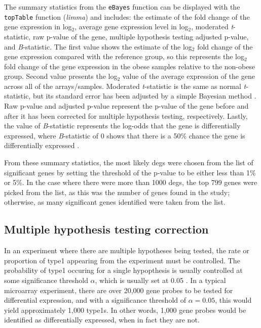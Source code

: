 The summary statistics from the \texttt{eBayes} function can be displayed with the \texttt{topTable} function (\textit{limma}) and includes: the estimate of the fold change of the gene expression in log$_2$, average gene expression level in log$_2$, moderated \textit{t}-statistic, raw p-value of the gene, multiple hypothesis testing adjusted p-value, and \textit{B}-statistic.
The first value shows the estimate of the log$_2$ fold change of the gene expression compared with the reference group, so this represents the log$_2$ fold change of the gene expression in the obese samples relative to the non-obese group.
Second value presents the log$_2$ value of the average expression of the gene across all of the arrays/samples.
Moderated \textit{t}-statistic is the same as normal \textit{t}-statistic, but its standard error has been adjusted by a simple Bayesian method \citep{Smyth2005}.
Raw p-value and adjusted p-value represent the p-value of the gene before and after it has been corrected for multiple hypothesis testing, respectively.
Lastly, the value of \textit{B}-statistic represents the log-odds that the gene is differentially expressed, where \textit{B}-statistic of 0 shows that there is a 50\% chance the gene is differentially expressed \citep{Smyth2005}.

From these summary statistics, the most likely \glspl{deg} were chosen from the list of significant genes by setting the threshold of the p-value to be either less than 1\% or 5\%.
In the case where there were more than 1000 \glspl{deg}, the top 799 genes were picked from the list, as this was the number of genes found in the \citet{Creighton2012} study; otherwise, as many significant genes identified were taken from the list.

\subsection{Multiple hypothesis testing correction}
\label{sub:multiple_hypothesis_testing_correction}

In an experiment where there are multiple hypotheses being tested, the rate or proportion of \gls{type1} appearing from the experiment must be controlled.
The probability of \gls{type1} occuring for a single hypopthesis is usually controlled at some significance threshold $\alpha$, which is usually set at 0.05 \citep{Shaffer1995}.
In a typical microarray experiment, there are over 20,000 gene probes to be tested for differential expression, and with a significance threshold of $\alpha = 0.05$, this would yield approximately 1,000 \glspl{type1}.
In other words, 1,000 gene probes would be identified as differentially expressed, when in fact they are not.

